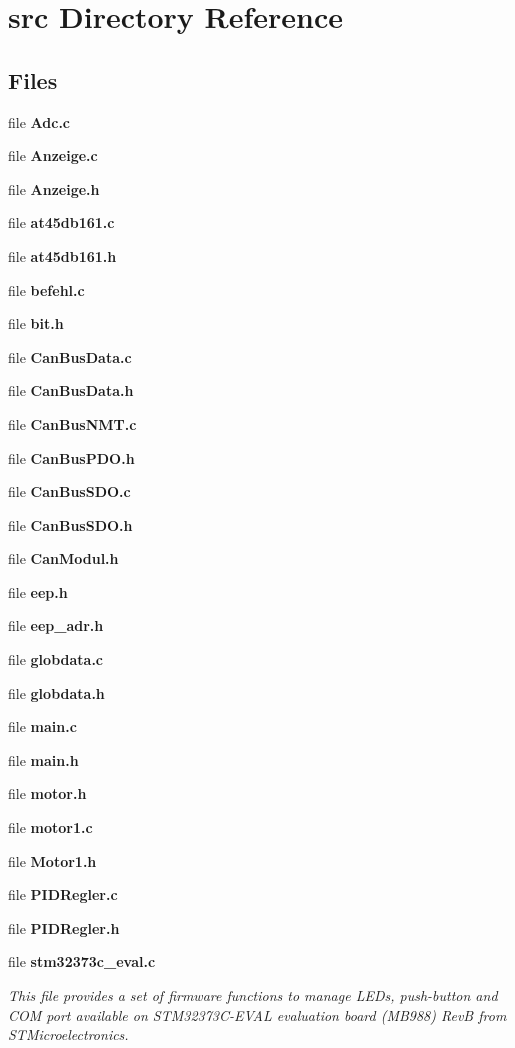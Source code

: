 \section{src Directory Reference}
\label{dir_68267d1309a1af8e8297ef4c3efbcdba}
\subsection*{Files}
\begin{DoxyCompactItemize}
\item 
file \textbf{ Adc.\+c}
\item 
file \textbf{ Anzeige.\+c}
\item 
file \textbf{ Anzeige.\+h}
\item 
file \textbf{ at45db161.\+c}
\item 
file \textbf{ at45db161.\+h}
\item 
file \textbf{ befehl.\+c}
\item 
file \textbf{ bit.\+h}
\item 
file \textbf{ Can\+Bus\+Data.\+c}
\item 
file \textbf{ Can\+Bus\+Data.\+h}
\item 
file \textbf{ Can\+Bus\+N\+M\+T.\+c}
\item 
file \textbf{ Can\+Bus\+P\+D\+O.\+h}
\item 
file \textbf{ Can\+Bus\+S\+D\+O.\+c}
\item 
file \textbf{ Can\+Bus\+S\+D\+O.\+h}
\item 
file \textbf{ Can\+Modul.\+h}
\item 
file \textbf{ eep.\+h}
\item 
file \textbf{ eep\+\_\+adr.\+h}
\item 
file \textbf{ globdata.\+c}
\item 
file \textbf{ globdata.\+h}
\item 
file \textbf{ main.\+c}
\item 
file \textbf{ main.\+h}
\item 
file \textbf{ motor.\+h}
\item 
file \textbf{ motor1.\+c}
\item 
file \textbf{ Motor1.\+h}
\item 
file \textbf{ P\+I\+D\+Regler.\+c}
\item 
file \textbf{ P\+I\+D\+Regler.\+h}
\item 
file \textbf{ stm32373c\+\_\+eval.\+c}
\begin{DoxyCompactList}\small\item\em This file provides a set of firmware functions to manage L\+E\+Ds, push-\/button and C\+OM port available on S\+T\+M32373\+C-\/\+E\+V\+AL evaluation board (M\+B988) RevB from S\+T\+Microelectronics. \end{DoxyCompactList}\item 

\end{DoxyCompactItemize}
